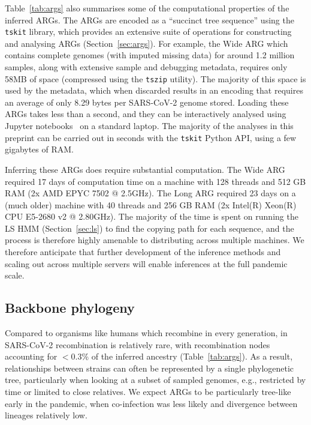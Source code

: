 \documentclass{article}
\begin{document}
Table~\ref{tab:args} also summarises some of the computational
properties of the inferred ARGs.
The ARGs are encoded as a ``succinct tree sequence'' using
the \texttt{tskit} library, which provides an extensive
suite of operations for constructing and analysing ARGs
(Section~\ref{sec:args}). For example, the Wide ARG
which contains complete genomes (with imputed missing data)
for around 1.2 million samples, along with extensive sample
and debugging metadata, requires only 58MB of space (compressed
using the \texttt{tszip} utility). The majority of this
space is used by the metadata, which when discarded results in
an encoding that requires an average of only 8.29 bytes per
SARS-CoV-2 genome stored.
Loading these ARGs takes less than a second, and they can be interactively
analysed using Jupyter notebooks~\citep{Kluyver2016-jupyter}
on a standard laptop. The majority
of the analyses in this preprint can be carried out in seconds
with the \texttt{tskit} Python API, using a few gigabytes of RAM.

Inferring these ARGs does require substantial computation.
The Wide ARG required 17 days of computation time on a machine with
128 threads and 512 GB RAM (2x AMD EPYC 7502 @ 2.5GHz). The Long ARG
required 23 days on a (much older) machine with 40 threads and 256 GB RAM (2x
Intel(R) Xeon(R) CPU E5-2680 v2 @ 2.80GHz). The majority of the time is spent
on running the LS HMM (Section~\ref{sec:ls}) to find the copying
path for each sequence, and the process
is therefore highly amenable to distributing across multiple machines.
We therefore anticipate that further development of the
inference methods and scaling out across multiple servers will
enable inferences at the full pandemic scale.


\subsection{Backbone phylogeny}
\label{sec:backbone_phylogeny}
Compared to organisms like humans which recombine in every generation,
in SARS-CoV-2 recombination is relatively rare, with recombination nodes accounting
for $<$0.3\% of the inferred ancestry (Table~\ref{tab:args}). As a result,
relationships between strains can often be represented by a
single phylogenetic tree, particularly when looking at
a subset of sampled genomes, e.g., restricted by time or limited to close
relatives. We expect ARGs to be particularly tree-like
early in the pandemic, when co-infection was less likely and divergence between
lineages relatively low.
\end{document}
